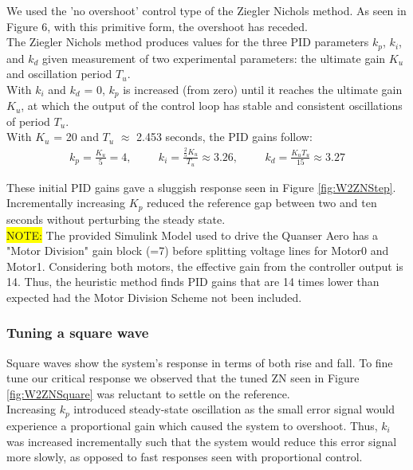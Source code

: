 \documentclass[11pt]{article}
\begin{document}
We used the 'no overshoot' control type of the Ziegler Nichols method. As seen in Figure 6, with this primitive form, the overshoot has receded.\\

The Ziegler Nichols method produces values for the three PID parameters $k_p$, $k_i$, and $k_d$ given measurement of two
experimental parameters: the ultimate gain $K_{u}$ and oscillation period $T_{u}$.\\

With $k_{i}$ and $k_{d}$ = 0, $k_{p}$ is increased (from zero) until it reaches the ultimate gain 
$K_{u}$, at which the output of the control loop has stable and consistent oscillations of period $T_{u}$.\\

With $K_{u}$ = 20 and $T_{u}$ $\approx$ 2.453 seconds, the PID gains follow:
\begin{align*}
    k_p = \frac{K_u}{5} = 4, \hspace{1cm} k_i = \frac{\frac{2}{5}K_u}{T_u} \approx 3.26, \hspace{1cm} k_d = \frac{K_u T_u}{15} \approx 3.27
\end{align*}

These initial PID gains gave a sluggish response seen in Figure \ref{fig:W2ZNStep}.
Incrementally increasing $K_{p}$ reduced the reference gap between two and ten seconds without perturbing the steady state.\\

\colorbox{yellow}{NOTE:}
The provided Simulink Model used to drive the Quanser Aero has a "Motor Division" gain block (=7) before splitting voltage lines for Motor0 and Motor1. Considering both motors, the effective gain from the controller output is 14. Thus, the heuristic method finds PID gains that are 14 times lower than expected had the Motor Division Scheme not been included.

\newpage
\subsubsection{Tuning a square wave}
Square waves show the system's response in terms of both rise and fall.
To fine tune our critical response we observed that the tuned ZN seen in Figure \ref{fig:W2ZNSquare}
was reluctant to settle on the reference.\\

Increasing $k_p$ introduced steady-state oscillation as the small error signal would experience a
proportional gain which caused the system to overshoot. Thus, $k_i$ was increased incrementally such
that the system would reduce this error signal more slowly, as opposed to fast responses seen with proportional control.
\end{document}

